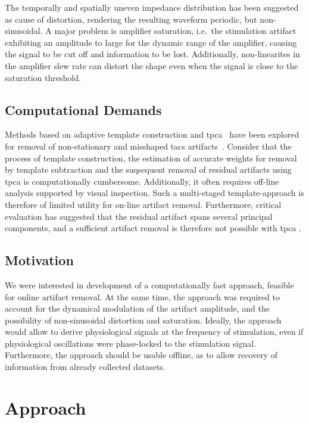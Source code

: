 \documentclass[a4paper]{article}
\begin{document}
The temporally and spatially uneven impedance distribution has been suggested as cause of distortion, rendering the resulting waveform periodic, but non-sinusoidal.
A major problem is amplifier saturation, i.e.\ the stimulation artifact exhibiting an amplitude to large for the dynamic range of the amplifier, causing the signal to be cut off and information to be lost.
Additionally, non-linearites in the amplifier slew rate can distort the shape even when the signal is close to the saturation threshold.

\subsection{Computational Demands}

Methods based on adaptive template construction and \gls{tpca}~\citep{Niazy_2005} have been explored for removal of  non-stationary and misshaped \gls{tacs} artifacts~\citep{Helfrich_2014}.
Consider that the process of template construction, the estimation of accurate weights for removal by template subtraction and the suqsequent removal of residual artifacts using \gls{tpca} is computationally cumbersome. Additionally, it often requires off-line analysis supported by visual inspection.
Such a multi-staged template-approach is therefore of limited utility for on-line artifact removal. Furthermore, critical evaluation has suggested that the residual artifact spans several principal components, and a sufficient artifact removal is therefore not possible with \gls{tpca} \citep{Noury_2016}.

\subsection{Motivation}

We were interested in development of a computationally fast approach, feasible for online artifact removal.
At the same time, the approach was required to account for the dynamical modulation of the artifact amplitude, and the possibility of non-sinusoidal distortion and saturation.
Ideally, the approach would allow to derive physiological signals at the frequency of stimulation, even if physiological oscillations were phase-locked to the stimulation signal.
Furthermore, the approach should be usable offline, as to allow recovery of information from already collected datasets.

\section{Approach}
\end{document}
